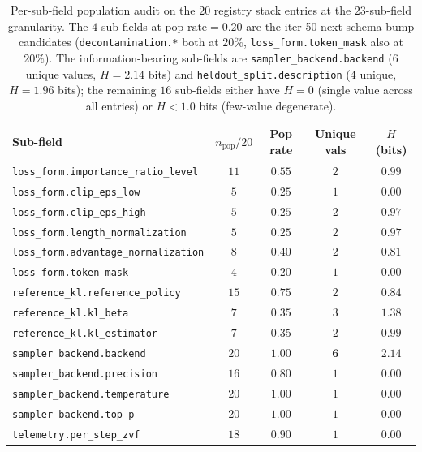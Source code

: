 \begin{table}[t]
\centering
\small
\caption{Per-sub-field population audit on the $20$ registry stack
entries at the $23$-sub-field granularity. The $4$ sub-fields at
$\mathrm{pop\_rate}=0.20$ are the iter-50 next-schema-bump candidates
(\texttt{decontamination.*} both at $20\%$, \texttt{loss\_form.token\_mask}
also at $20\%$). The information-bearing sub-fields are
\texttt{sampler\_backend.backend} ($6$ unique values, $H = 2.14$ bits) and
\texttt{heldout\_split.description} ($4$ unique, $H = 1.96$ bits); the
remaining $16$ sub-fields either have $H = 0$ (single value across
all entries) or $H < 1.0$ bits (few-value degenerate).}
\label{tab:p6-minreport-subfield}
\begin{tabular}{lcccc}
\toprule
Sub-field & $n_{\text{pop}}/20$ & Pop rate & Unique vals & $H$ (bits) \\
\midrule
\texttt{loss\_form.importance\_ratio\_level}  & $11$ & $0.55$ & $2$ & $0.99$ \\
\texttt{loss\_form.clip\_eps\_low}             & $5$  & $0.25$ & $1$ & $0.00$ \\
\texttt{loss\_form.clip\_eps\_high}            & $5$  & $0.25$ & $2$ & $0.97$ \\
\texttt{loss\_form.length\_normalization}     & $5$  & $0.25$ & $2$ & $0.97$ \\
\texttt{loss\_form.advantage\_normalization}  & $8$  & $0.40$ & $2$ & $0.81$ \\
\texttt{loss\_form.token\_mask}                & $4$  & $\mathbf{0.20}$ & $1$ & $0.00$ \\
\texttt{reference\_kl.reference\_policy}      & $15$ & $0.75$ & $2$ & $0.84$ \\
\texttt{reference\_kl.kl\_beta}                & $7$  & $0.35$ & $3$ & $1.38$ \\
\texttt{reference\_kl.kl\_estimator}           & $7$  & $0.35$ & $2$ & $0.99$ \\
\texttt{sampler\_backend.backend}             & $20$ & $1.00$ & $\mathbf{6}$ & $\mathbf{2.14}$ \\
\texttt{sampler\_backend.precision}           & $16$ & $0.80$ & $1$ & $0.00$ \\
\texttt{sampler\_backend.temperature}         & $20$ & $1.00$ & $1$ & $0.00$ \\
\texttt{sampler\_backend.top\_p}               & $20$ & $1.00$ & $1$ & $0.00$ \\
\texttt{telemetry.per\_step\_zvf}             & $18$ & $0.90$ & $1$ & $0.00$ \\

\end{tabular}
\end{table}
